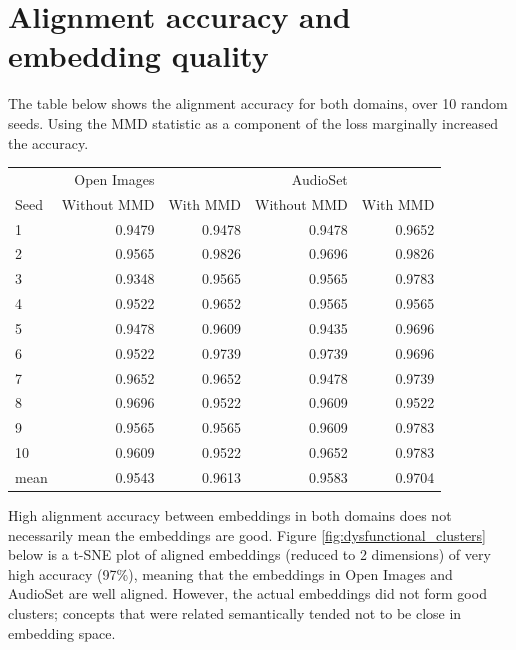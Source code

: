 \section{Alignment accuracy and embedding quality}

The table below shows the alignment accuracy for both domains, over 10 random seeds. Using the MMD statistic as a component of the loss marginally increased the accuracy. 

\begin{table}[H]
\centering
\begin{tabular}{lrrrr}
  \toprule
       &    Open Images&               &  AudioSet    &            \\
{Seed} &    Without MMD &   With MMD   &  Without MMD &   With MMD \\
\midrule
1    &       0.9479 &        0.9478&    0.9478 &  0.9652  \\
2    &       0.9565 &        0.9826&    0.9696 &  0.9826  \\
3    &       0.9348 &        0.9565&    0.9565 &  0.9783  \\
4    &       0.9522 &        0.9652&    0.9565 &  0.9565  \\
5    &       0.9478 &        0.9609&    0.9435 &  0.9696  \\
6    &       0.9522 &        0.9739&    0.9739 &  0.9696  \\
7    &       0.9652 &        0.9652&    0.9478 &  0.9739  \\
8    &       0.9696 &        0.9522&    0.9609 &  0.9522  \\
9    &       0.9565 &        0.9565&    0.9609 &  0.9783  \\
10   &       0.9609 &        0.9522&    0.9652 &  0.9783  \\
\midrule                                                         
mean &       0.9543 &        0.9613 &   0.9583 &  0.9704  \\
\bottomrule
\end{tabular}
\end{table}

High alignment accuracy between embeddings in both domains does not necessarily mean the embeddings are good. Figure \ref{fig:dysfunctional_clusters} below is a t-SNE plot of aligned embeddings (reduced to 2 dimensions) of very high accuracy (97\%), meaning that the embeddings in Open Images and AudioSet are well aligned. However, the actual embeddings did not form good clusters; concepts that were related semantically tended not to be close in embedding space. 

